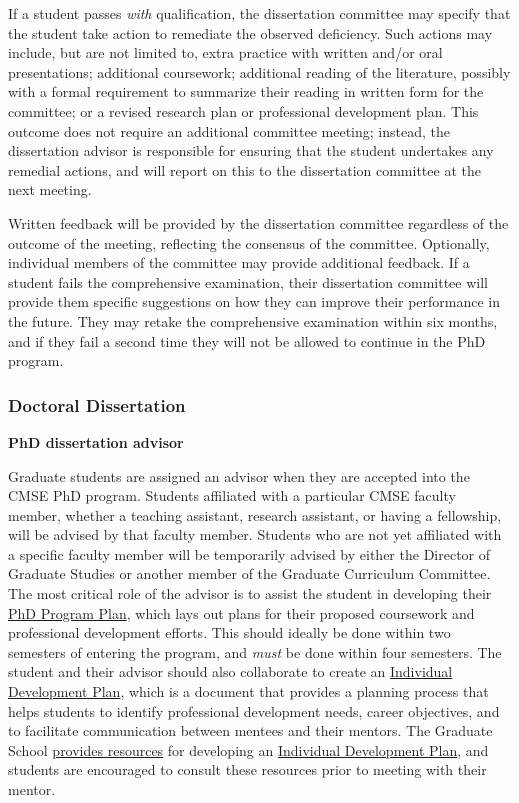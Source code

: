 If a student passes \textit{with} qualification, the dissertation committee
may specify that the student take action to remediate the observed
deficiency.  Such actions may include, but are not limited to, extra
practice with written and/or oral presentations; additional
coursework; additional reading of the literature, possibly with a
formal requirement to summarize their reading in written form for the
committee; or a revised research plan or professional development
plan.  This outcome does not require an additional committee meeting;
instead, the dissertation advisor is responsible for ensuring that the
student undertakes any remedial actions, and will report on this to
the dissertation committee at the next meeting.

Written feedback will be provided by the dissertation committee
regardless of the outcome of the meeting, reflecting the consensus of
the committee.  Optionally, individual members of the committee may
provide additional feedback.
If a student fails the comprehensive examination, their dissertation
committee will provide them specific suggestions on
how they can improve their performance in the future.  They may retake
the comprehensive examination within six months, and if they fail a
second time they will not be allowed to continue in the PhD program.


\vspace{3mm}
\subsubsection{Doctoral Dissertation}
\label{sec:phd_dissertation}

\vspace{3mm}
\noindent
\textbf{PhD dissertation advisor}

Graduate students are assigned an advisor when they are accepted into
the CMSE PhD program.  Students affiliated with a particular CMSE
faculty member, whether a teaching assistant, research assistant, or
having a fellowship, will be advised by that faculty member.  Students
who are not yet affiliated with a specific faculty member will be
temporarily advised by either the Director of Graduate Studies or
another member of the Graduate Curriculum Committee.  The most
critical role of the advisor is to assist the student in developing
their \href{https://login.msu.edu/?App=J3205}{PhD Program Plan}, which
lays out plans for their proposed coursework and professional
development efforts.  This should ideally be done within two semesters
of entering the program, and \textit{must} be done within four
semesters.  The student and their advisor should also collaborate  to create an
\href{http://caffe.grd.msu.edu/IDP}{Individual Development Plan},
which is a document that provides a planning process that helps
students to identify professional development needs, career
objectives, and to facilitate communication between mentees and their
mentors.  The Graduate School
\href{https://grad.msu.edu/prep}{provides resources} for developing an
\href{http://caffe.grd.msu.edu/IDP}{Individual Development Plan}, and
students are encouraged to consult these resources prior to meeting
with their mentor.

